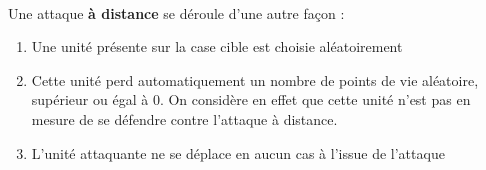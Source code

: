 \paragraph{}
Une attaque \textbf{à distance} se déroule d'une autre façon :

\begin{enumerate}
  \item Une unité présente sur la case cible est choisie aléatoirement
  \item Cette unité perd automatiquement un nombre de points de vie aléatoire, supérieur ou égal à 0. On considère en effet que cette unité n'est pas en mesure de se défendre contre l'attaque à distance.
  \item L'unité attaquante ne se déplace en aucun cas à l'issue de l'attaque
\end{enumerate}


